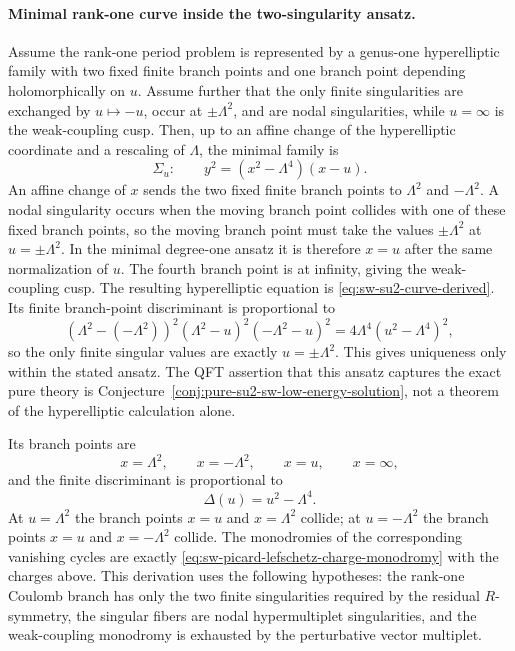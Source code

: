 \paragraph{Minimal rank-one curve inside the two-singularity ansatz.}
Assume the rank-one period problem is represented by a genus-one
hyperelliptic family with two fixed finite branch points and one branch point
depending holomorphically on \(u\).  Assume further that the only finite
singularities are exchanged by \(u\mapsto -u\), occur at
\(\pm\Lambda^2\), and are nodal singularities, while \(u=\infty\) is the
weak-coupling cusp.  Then, up to an affine change of the hyperelliptic
coordinate and a rescaling of \(\Lambda\), the minimal family is
\begin{equation}
  \Sigma_u:\qquad
  y^2=(x^2-\Lambda^4)(x-u).
  \label{eq:sw-su2-curve-derived}
\end{equation}
An affine change of \(x\) sends the two fixed finite branch points to
\(\Lambda^2\) and \(-\Lambda^2\).  A nodal singularity occurs when the moving
branch point collides with one of these fixed branch points, so the moving
branch point must take the values \(\pm\Lambda^2\) at
\(u=\pm\Lambda^2\).  In the minimal degree-one ansatz it is therefore \(x=u\)
after the same normalization of \(u\).  The fourth branch point is at
infinity, giving the weak-coupling cusp.  The resulting hyperelliptic
equation is \eqref{eq:sw-su2-curve-derived}.  Its finite branch-point
discriminant is proportional to
\[
  (\Lambda^2-(-\Lambda^2))^2
  (\Lambda^2-u)^2(-\Lambda^2-u)^2
  =
  4\Lambda^4(u^2-\Lambda^4)^2,
\]
so the only finite singular values are exactly \(u=\pm\Lambda^2\).  This
gives uniqueness only within the stated ansatz.  The QFT assertion that this
ansatz captures the exact pure theory is
Conjecture~\ref{conj:pure-su2-sw-low-energy-solution}, not a theorem of the
hyperelliptic calculation alone.

Its branch points are
\[
  x=\Lambda^2,\qquad x=-\Lambda^2,\qquad x=u,\qquad x=\infty,
\]
and the finite discriminant is proportional to
\[
  \Delta(u)=u^2-\Lambda^4 .
\]
At \(u=\Lambda^2\) the branch points \(x=u\) and \(x=\Lambda^2\) collide; at
\(u=-\Lambda^2\) the branch points \(x=u\) and \(x=-\Lambda^2\) collide.  The
monodromies of the corresponding vanishing cycles are exactly
\eqref{eq:sw-picard-lefschetz-charge-monodromy} with the charges above.  This
derivation uses the following hypotheses: the rank-one Coulomb branch has
only the two finite singularities required by the residual \(R\)-symmetry, the
singular fibers are nodal hypermultiplet singularities, and the weak-coupling
monodromy is exhausted by the perturbative vector multiplet.

